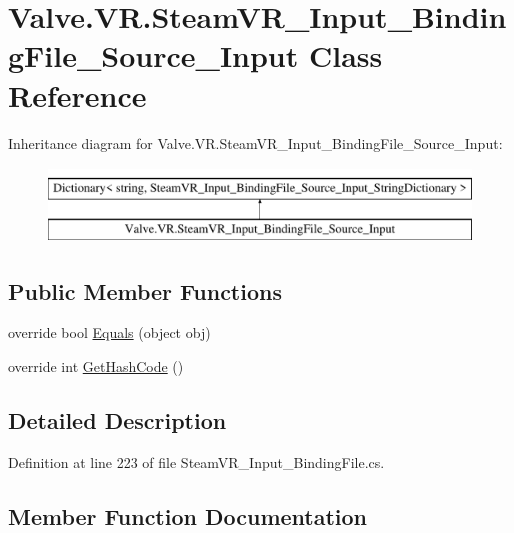 \hypertarget{class_valve_1_1_v_r_1_1_steam_v_r___input___binding_file___source___input}{}\section{Valve.\+V\+R.\+Steam\+V\+R\+\_\+\+Input\+\_\+\+Binding\+File\+\_\+\+Source\+\_\+\+Input Class Reference}
\label{class_valve_1_1_v_r_1_1_steam_v_r___input___binding_file___source___input}
Inheritance diagram for Valve.\+V\+R.\+Steam\+V\+R\+\_\+\+Input\+\_\+\+Binding\+File\+\_\+\+Source\+\_\+\+Input\+:\begin{figure}[H]
\begin{center}
\leavevmode
\includegraphics[height=2.000000cm]{class_valve_1_1_v_r_1_1_steam_v_r___input___binding_file___source___input}
\end{center}
\end{figure}
\subsection*{Public Member Functions}
\begin{DoxyCompactItemize}
\item 
override bool \mbox{\hyperlink{class_valve_1_1_v_r_1_1_steam_v_r___input___binding_file___source___input_a7d55eb514fd042d80697b11135203e91}{Equals}} (object obj)
\item 
override int \mbox{\hyperlink{class_valve_1_1_v_r_1_1_steam_v_r___input___binding_file___source___input_a25a588fadf339725ea84266038f7aca5}{Get\+Hash\+Code}} ()
\end{DoxyCompactItemize}


\subsection{Detailed Description}


Definition at line 223 of file Steam\+V\+R\+\_\+\+Input\+\_\+\+Binding\+File.\+cs.



\subsection{Member Function Documentation}
\mbox{\label{class_valve_1_1_v_r_1_1_steam_v_r___input___binding_file___source___input_a7d55eb514fd042d80697b11135203e91}} 

